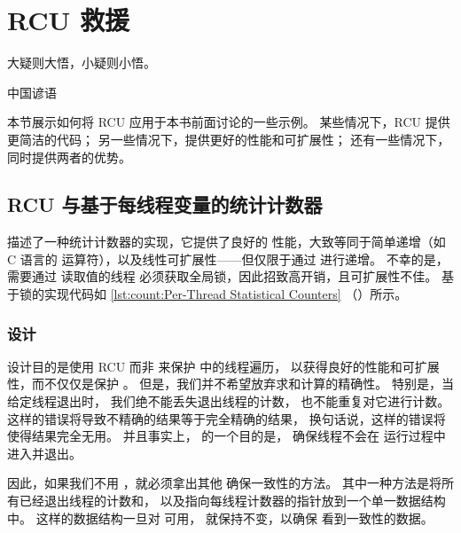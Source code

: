 
\section{RCU 救援}
\label{sec:together:RCU Rescues}
%
\epigraph{大疑则大悟，小疑则小悟。}
	 {中国谚语}

本节展示如何将 RCU 应用于本书前面讨论的一些示例。
某些情况下，RCU 提供更简洁的代码；
另一些情况下，提供更好的性能和可扩展性；
还有一些情况下，同时提供两者的优势。

\subsection{RCU 与基于每线程变量的统计计数器}
\label{sec:together:RCU and Per-Thread-Variable-Based Statistical Counters}

描述了一种统计计数器的实现，它提供了良好的
性能，大致等同于简单递增（如 C 语言的 \co{++}
运算符），以及线性可扩展性——但仅限于通过
 进行递增。
不幸的是，需要通过  读取值的线程
必须获取全局锁，因此招致高开销，且可扩展性不佳。
基于锁的实现代码如
\cref{lst:count:Per-Thread Statistical Counters}
（）所示。

\QuickQuizEnd

\subsubsection{设计}

设计目的是使用 RCU 而非  来保护
 中的线程遍历，
以获得良好的性能和可扩展性，而不仅仅是保护
。
但是，我们并不希望放弃求和计算的精确性。
特别是，当给定线程退出时，
我们绝不能丢失退出线程的计数，
也不能重复对它进行计数。
这样的错误将导致不精确的结果等于完全精确的结果，
换句话说，这样的错误将使得结果完全无用。
并且事实上， 的一个目的是，
确保线程不会在  运行过程中进入并退出。

因此，如果我们不用 ，就必须拿出其他
确保一致性的方法。
其中一种方法是将所有已经退出线程的计数和，
以及指向每线程计数器的指针放到一个单一数据结构中。
这样的数据结构一旦对  可用，
就保持不变，以确保  看到一致性的数据。

